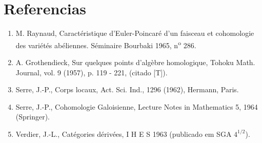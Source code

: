 \section*{Referencias}

\begin{enumerate}
\item[{[1]}] M. Raynaud, Caractéristique d'Euler-Poincaré d'un faisceau et cohomologie des variétés abéliennes. Séminaire Bourbaki 1965, n\textsuperscript{o} 286.
\item[{[2]}] A. Grothendieck, Sur quelques points d'algèbre homologique, Tohoku Math. Journal, vol. 9 (1957), p. 119 - 221, (citado [T]).
\item[{[3]}] Serre, J.-P., Corps locaux, Act. Sci. Ind., 1296 (1962), Hermann, Paris.
\item[{[4]}] Serre, J.-P., Cohomologie Galoisienne, Lecture Notes in Mathematics 5, 1964 (Springer).
\item[{[5]}] Verdier, J.-L., Catégories dérivées, I H E S 1963 (publicado em SGA $4^{1/2}$).
\end{enumerate}
